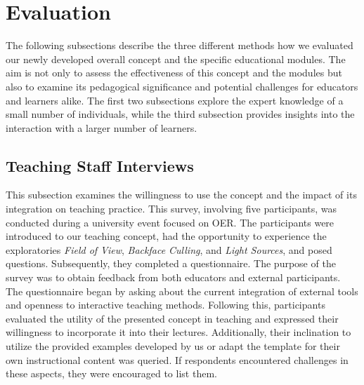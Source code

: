 \section{Evaluation}
The following subsections describe the three different methods how we evaluated our newly developed overall concept and the specific educational modules. The aim is not only to assess the effectiveness of this concept and the modules but also to examine its pedagogical significance and potential challenges for educators and learners alike. The first two subsections explore the expert knowledge of a small number of individuals, while the third subsection provides insights into the interaction with a larger number of learners.

\subsection{Teaching Staff Interviews}%
This subsection examines the willingness to use the concept and the impact of its integration on teaching practice. This survey, involving five participants, was conducted during a university event focused on OER. The participants were introduced to our teaching concept, had the opportunity to experience the exploratories \emph{Field of View}, \emph{Backface Culling}, and \emph{Light Sources}, and posed questions. Subsequently, they completed a questionnaire.
The purpose of the survey was to obtain feedback from both educators and external participants. The questionnaire began by asking about the current integration of external tools and openness to interactive teaching methods. Following this, participants evaluated the utility of the presented concept in teaching and expressed their willingness to incorporate it into their lectures. Additionally, their inclination to utilize the provided examples developed by us or adapt the template for their own instructional content was queried. If respondents encountered challenges in these aspects, they were encouraged to list them.

